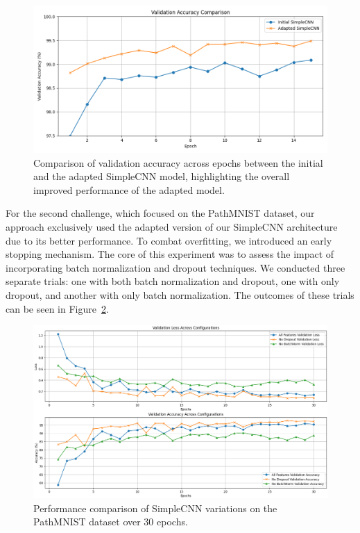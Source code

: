 \begin{figure} [ht]
    \centering
    \includegraphics[width=.9\textwidth]{figures/simpleCNN_old_vs_new.png}
    \caption{Comparison of validation accuracy across epochs between the initial and the adapted SimpleCNN model, highlighting the overall improved performance of the adapted model.}\label{fig:SimpleCNN_old_new}
\end{figure}

For the second challenge, which focused on the PathMNIST dataset, our approach exclusively used the adapted version of our SimpleCNN architecture due to its better performance. To combat overfitting, we introduced an early stopping mechanism. The core of this experiment was to assess the impact of incorporating batch normalization and dropout techniques. We conducted three separate trials: one with both batch normalization and dropout, one with only dropout, and another with only batch normalization. The outcomes of these trials can be seen in Figure~\ref{fig:pathMNIST_variations}.

\begin{figure} [ht]
  \centering
  \includegraphics[width=1\textwidth]{figures/simpleCNN_PathMNIST_variations.png}
  \caption{Performance comparison of SimpleCNN variations on the PathMNIST dataset over 30 epochs.}\label{fig:pathMNIST_variations}
\end{figure}